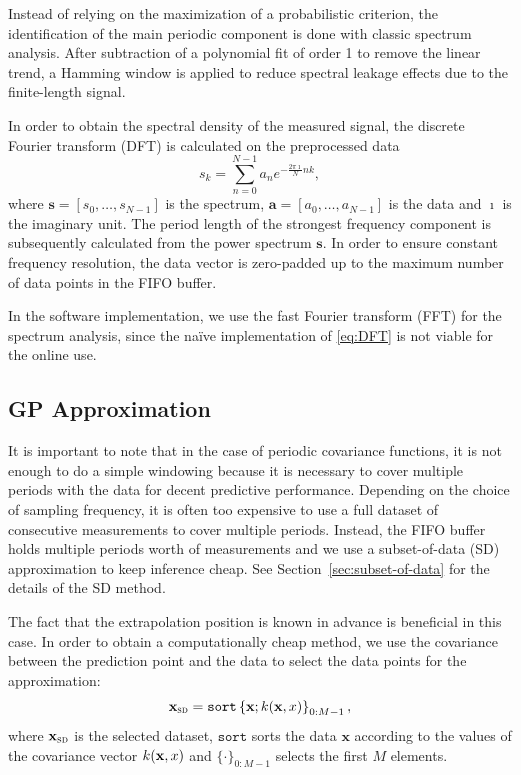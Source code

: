 Instead of relying on the maximization of a probabilistic criterion, the
identification of the main periodic component is done with classic spectrum
analysis. After subtraction of a polynomial fit of order 1 to remove the linear
trend, a Hamming window \cite[.1]{Oppenheim.ea:1999:Discrete} is applied
to reduce spectral leakage effects due to the finite-length signal.

In order to obtain the spectral density of the measured signal, the discrete
Fourier transform (DFT)  is
calculated on the preprocessed data
\begin{equation}
  \label{eq:DFT}
  s_k = \sum_{n=0}^{N-1} a_n e^{-\frac{2\pi \imath}{N} nk},
\end{equation}
where $\mathbf{s}=[s_0, \dots, s_{N-1}]$ is the spectrum, $\mathbf{a}=[a_0,
\dots, a_{N-1}]$ is the data and $\imath$ is the imaginary unit. The period
length of the strongest frequency component is subsequently calculated from the
power spectrum $\mathbf{s}$. In order to ensure constant frequency resolution,
the data vector is zero-padded up to the maximum number of data points in the
FIFO buffer.

In the software implementation, we use the fast Fourier transform (FFT)
for the spectrum analysis, since the na{\"i}ve
implementation of \eqref{eq:DFT} is not viable for the online use.

\subsection{GP Approximation}

It is important to note that in the case of periodic covariance functions, it
is not enough to do a simple windowing because it is necessary to cover
multiple periods with the data for decent predictive performance. Depending on
the choice of sampling frequency, it is often too expensive to use a full
dataset of consecutive measurements to cover multiple periods. Instead, the
FIFO buffer holds multiple periods worth of measurements and we use a
subset-of-data (SD) approximation to keep inference cheap. See
Section~\ref{sec:subset-of-data} for the details of the SD method.

The fact that the extrapolation position is known in advance is beneficial in
this case. In order to obtain a computationally cheap method, we use the
covariance between the prediction point and the data to select the data points
for the approximation:
\begin{equation}
  \mathbf{x}_{\normalfont\textsc{sd}} = \mathtt{sort}\left\{\mathbf{x}; k(
\mathbf{x},x)\right\}_{0:M-1},
\end{equation}
where $\mathbf{x}_{\normalfont\textsc{sd}}$ is the selected dataset, $\mathtt{sort}$ sorts
the data $\mathbf{x}$ according to the values of the covariance vector $k(
\mathbf{x},x)$ and $\{\cdot\}_{0:M-1}$ selects the first $M$ elements.

